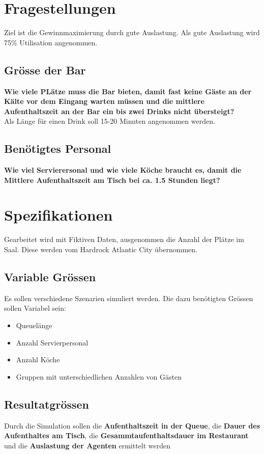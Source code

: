 \documentclass[ngerman,a4paper,12pt]{scrreprt}
\begin{document}
\section{Fragestellungen}
Ziel ist die Gewinnmaximierung durch gute Auslastung. Als gute Auslastung wird 75\% Utilisation angenommen.
\subsection{Grösse der Bar}
\textbf{Wie viele PLätze muss die Bar bieten, damit fast keine Gäste an der Kälte vor dem Eingang warten müssen und die mittlere Aufenthaltszeit an der Bar ein bis zwei Drinks nicht übersteigt?} \\
Als Länge für einen Drink soll 15-20 Minuten angenommen werden.


\subsection{Benötigtes Personal}
\textbf{Wie viel Servierersonal und wie viele Köche braucht es, damit die Mittlere Aufenthaltszeit am Tisch bei ca. 1.5 Stunden liegt?} \\


\section{Spezifikationen}
Gearbeitet wird mit Fiktiven Daten, ausgenommen die Anzahl der Plätze im Saal. Diese werden vom Hardrock Atlantic City übernommen.

\subsection{Variable Grössen}
Es sollen verschiedene Szenarien simuliert werden. Die dazu benötigten Grössen sollen Variabel sein:
\begin{itemize}
	\item Queuelänge
	\item Anzahl Servierpersonal
	\item Anzahl Köche
	\item Gruppen mit unterschiedlichen Anzahlen von Gästen
\end{itemize}

\subsection{Resultatgrössen}
Durch die Simulation sollen die \textbf{Aufenthaltszeit in der Queue}, die \textbf{Dauer des Aufenthaltes am Tisch}, die \textbf{Gesammtaufenthaltsdauer im Restaurant} und die \textbf{Auslastung der Agenten} ermittelt werden
\end{document}
